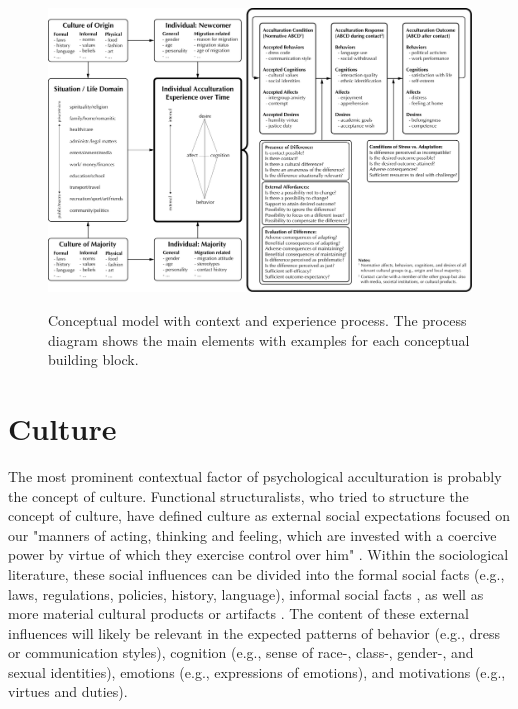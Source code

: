 \documentclass[man, 12pt, a4paper]{apa7}
\begin{document}
\begin{figure}
    \centering
    \caption{Conceptual model with context and experience process. The process diagram shows the main elements with examples for each conceptual building block.}
    \includegraphics[width=\textwidth]{Figures/ConceptualFrameworkExpandedOptima.pdf}
    \label{fig:SupModelContext}
\end{figure}

\section{Culture} 
The most prominent contextual factor of psychological acculturation is probably the concept of culture. Functional structuralists, who tried to structure the concept of culture, have defined culture as external social expectations focused on our "manners of acting, thinking and feeling, which are invested with a coercive power by virtue of which they exercise control over him" \citep[][p. 52; on social facts]{Durkheim1982, Gilbert1989}. Within the sociological literature, these social influences can be divided into the formal social facts (e.g., laws, regulations, policies, history, language), informal social facts \citep[e.g., norms, values, beliefs, rituals, customs; also see][]{Herzog2018}, as well as more material cultural products or artifacts \citep[e.g., food, fashion, architecture, or arts, such as film, music, literature, and fine arts; e.g., see][]{Alexander2001}. The content of these external influences will likely be relevant in the expected patterns of behavior (e.g., dress or communication styles), cognition (e.g., sense of race-, class-, gender-, and sexual identities), emotions (e.g., expressions of emotions), and motivations (e.g., virtues and duties).
\end{document}
